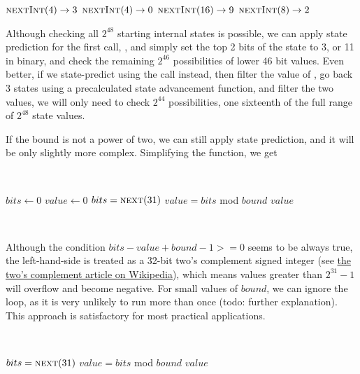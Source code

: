 \documentclass{article}
\begin{document}
\begin{algorithmic}
    \State $\Call{nextInt}{4} \to 3$
    \State $\Call{nextInt}{4} \to 0$
    \State $\Call{nextInt}{16} \to 9$
    \State $\Call{nextInt}{8} \to 2$\\
\end{algorithmic}

\noindent Although checking all $2^{48}$ starting internal states is possible, we can apply state prediction for the first call, , and simply set the top 2 bits of the state to 3, or 11 in binary, and check the remaining $2^{46}$ possibilities of lower 46 bit values. 
Even better, if we state-predict using the  call instead, then filter the value of , go back 3 states using a precalculated state advancement function, and filter the two  values, we will only need to check $2^{44}$ possibilities, one sixteenth of the full range of $2^{48}$ state values. %

If the  bound is not a power of two, we can still apply state prediction, and it will be only slightly more complex. Simplifying the  function, we get

\
\begin{algorithmic}
    \State $bits \gets 0$
    \State $value \gets 0$
    \Repeat
        \State $bits = \Call{next}{31}$
        \State $value = bits$ mod $bound$
    \State \Return $value$
\EndFunction
\end{algorithmic}
\ \

Although the condition $bits - value + bound - 1 >= 0$ seems to be always true, the left-hand-side is treated as a 32-bit two's complement signed integer (see \href{https://en.wikipedia.org/wiki/Two%27s_complement}{the two's complement article on Wikipedia}), which means values greater than $2^{31} - 1$ will overflow and become negative. For small values of $bound$, we can ignore the loop, as it is very unlikely to run more than once (todo: further explanation). This approach is satisfactory for most practical applications. 

\
\begin{algorithmic}
\Function{nextInt}{$bound$}
    \State $bits = \Call{next}{31}$
    \State $value = bits$ mod $bound$
    \State \Return $value$
\EndFunction
\end{algorithmic}
\ \
\end{document}
